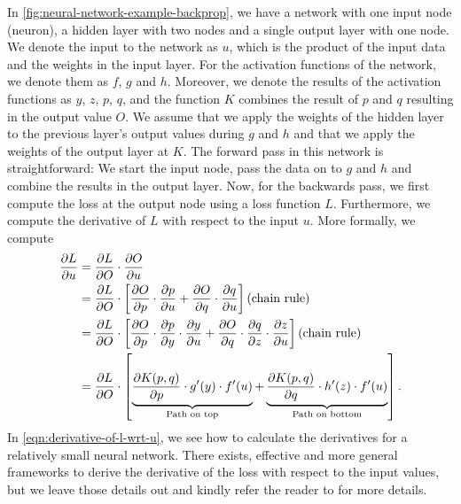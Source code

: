 In \cref{fig:neural-network-example-backprop}, we have a network with one input node (neuron), a hidden layer with two nodes and a single output layer with one node. We denote the input to the network as $u$, which is the product of the input data and the weights in the input layer. For the activation functions of the network, we denote them as $f$, $g$ and $h$. Moreover, we denote the results of the activation functions as $y$, $z$, $p$, $q$, and the function $K$ combines the result of $p$ and $q$ resulting in the output value $O$. We assume that we apply the weights of the hidden layer to the previous layer's output values during $g$ and $h$ and that we apply the weights of the output layer at $K$. The forward pass in this network is straightforward: We start the input node, pass the data on to $g$ and $h$ and combine the results in the output layer. Now, for the backwards pass, we first compute the loss at the output node using a loss function $L$. Furthermore, we compute the derivative of $L$ with respect to the input $u$. More formally, we compute
\begin{align}
    \parder{L}{u}
    &= \parder{L}{O} \cdot \parder{O}{u} \label{eqn:derivative-of-l-wrt-u} \\
    &= \parder{L}{O} \cdot \left[
    \parder{O}{p} \cdot \parder{p}{u} +
    \parder{O}{q} \cdot \parder{q}{u}
    \right] \text{(chain rule)} \notag \\
    &= \parder{L}{O} \cdot \left[
    \parder{O}{p} \cdot \parder{p}{y} \cdot \parder{y}{u} + 
    \parder{O}{q} \cdot \parder{q}{z} \cdot \parder{z}{u}
    \right] \text{(chain rule)} \notag \\
    &= \parder{L}{O} \cdot \left[
    \undertext{\parder{K(p, q)}{p} \cdot g'(y) \cdot f'(u)}{Path on top} + 
    \undertext{\parder{K(p, q)}{q} \cdot h'(z) \cdot f'(u)}{Path on bottom} \notag
    \right].
\end{align}
In \cref{eqn:derivative-of-l-wrt-u}, we see how to calculate the derivatives for a relatively small neural network. There exists, effective and more general frameworks to derive the derivative of the loss with respect to the input values, but we leave those details out and kindly refer the reader to \cite[Chapter 1.3]{Aggarwal18} for more details.

